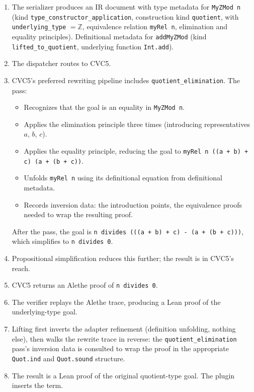 \documentclass[11pt,letterpaper]{article}
\theoremstyle{definition}
\theoremstyle{remark}
\begin{document}
\begin{enumerate}[leftmargin=2em]
  \item The serializer produces an IR document with type metadata for
        \texttt{MyZMod n} (kind \texttt{type\_constructor\_application},
        construction kind \texttt{quotient}, with
        \texttt{underlying\_type} $= \mathbb{Z}$, equivalence relation
        \texttt{myRel n}, elimination and equality principles).
        Definitional metadata for \texttt{addMyZMod} (kind
        \texttt{lifted\_to\_quotient}, underlying function
        \texttt{Int.add}).
  \item The dispatcher routes to CVC5.
  \item CVC5's preferred rewriting pipeline includes
        \texttt{quotient\_elimination}. The pass:
        \begin{itemize}
          \item Recognizes that the goal is an equality in
                \texttt{MyZMod n}.
          \item Applies the elimination principle three times
                (introducing representatives $a$, $b$, $c$).
          \item Applies the equality principle, reducing the goal to
                \texttt{myRel n ((a + b) + c) (a + (b + c))}.
          \item Unfolds \texttt{myRel n} using its definitional equation
                from definitional metadata.
          \item Records inversion data: the introduction points, the
                equivalence proofs needed to wrap the resulting proof.
        \end{itemize}
        After the pass, the goal is
        \texttt{n divides (((a + b) + c) - (a + (b + c)))}, which
        simplifies to \texttt{n divides 0}.
  \item Propositional simplification reduces this further; the result
        is in CVC5's reach.
  \item CVC5 returns an Alethe proof of \texttt{n divides 0}.
  \item The verifier replays the Alethe trace, producing a Lean proof
        of the underlying-type goal.
  \item Lifting first inverts the adapter refinement (definition unfolding,
        nothing else), then walks the rewrite trace in reverse: the
        \texttt{quotient\_elimination} pass's inversion data is consulted
        to wrap the proof in the appropriate \texttt{Quot.ind} and
        \texttt{Quot.sound} structure.
  \item The result is a Lean proof of the original quotient-type goal.
        The plugin inserts the term.
\end{enumerate}
\end{document}
